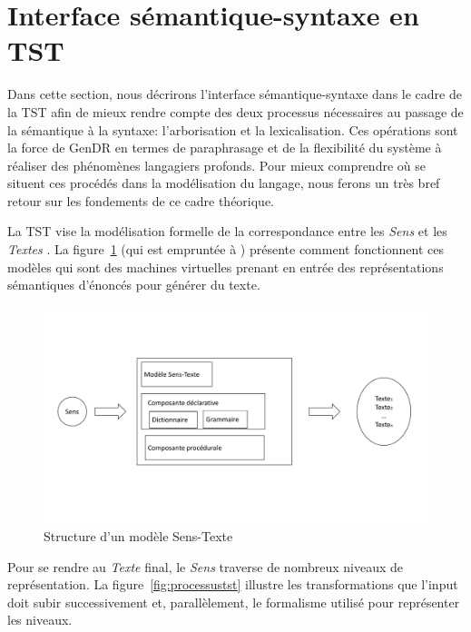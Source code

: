 \section{Interface sémantique-syntaxe en TST}\label{sec:semsynt}

Dans cette section, nous décrirons l'interface sémantique-syntaxe dans le cadre de la \ac{TST} afin de mieux rendre compte des deux processus nécessaires au passage de la sémantique à la syntaxe: l'arborisation et la lexicalisation. Ces opérations sont la force de GenDR en termes de paraphrasage et de la flexibilité du système à réaliser des phénomènes langagiers profonds. Pour mieux comprendre où se situent ces procédés dans la modélisation du langage, nous ferons un très bref retour sur les fondements de ce cadre théorique.

La \ac{TST} vise la modélisation formelle de la correspondance entre les \emph{Sens} et les \emph{Textes} \citep{DBLP:conf/coling/JolkovskyM67, MelcukVerslinguistiqueSensTexte1997, PolgueretheorieSensTexte1998}. La figure~\ref{fig:modeletst} (qui est empruntée à \cite{PolgueretheorieSensTexte1998}) présente comment fonctionnent ces modèles qui sont des machines virtuelles prenant en entrée des représentations sémantiques d'énoncés pour générer du texte.

\begin{figure}[htb]
	\centering
	\includegraphics[width=1\textwidth, trim = {1cm 5.1cm 0cm 4.3cm},clip]{ch3/figs/polguere1.pdf}
	\caption{Structure d'un modèle Sens-Texte \citep{PolgueretheorieSensTexte1998}}
	\label{fig:modeletst}
\end{figure}

Pour se rendre au \emph{Texte} final, le \emph{Sens} traverse de nombreux niveaux de représentation. La figure~\ref{fig:processustst} illustre les transformations que l'input doit subir successivement et, parallèlement, le formalisme utilisé pour représenter les niveaux.

